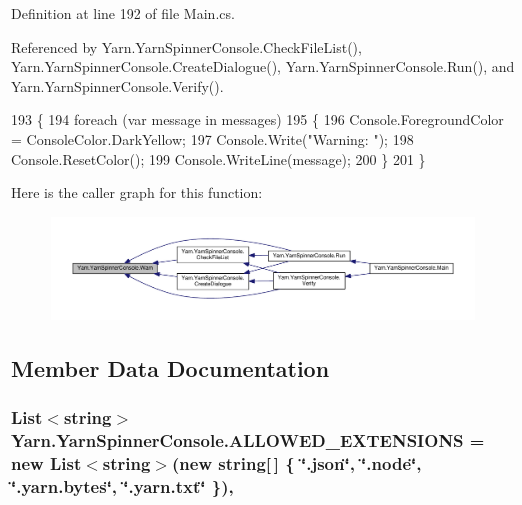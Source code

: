 Definition at line 192 of file Main.\-cs.



Referenced by Yarn.\-Yarn\-Spinner\-Console.\-Check\-File\-List(), Yarn.\-Yarn\-Spinner\-Console.\-Create\-Dialogue(), Yarn.\-Yarn\-Spinner\-Console.\-Run(), and Yarn.\-Yarn\-Spinner\-Console.\-Verify().


\begin{DoxyCode}
193         \{
194             \textcolor{keywordflow}{foreach} (var message \textcolor{keywordflow}{in} messages)
195             \{
196                 Console.ForegroundColor = ConsoleColor.DarkYellow;
197                 Console.Write(\textcolor{stringliteral}{"Warning: "});
198                 Console.ResetColor();
199                 Console.WriteLine(message);
200             \}
201         \}
\end{DoxyCode}


Here is the caller graph for this function\-:
\nopagebreak
\begin{figure}[H]
\begin{center}
\leavevmode
\includegraphics[width=350pt]{a00189_a979bb6f049b6c5294f745a19e24ddd9d_icgraph}
\end{center}
\end{figure}




\subsection{Member Data Documentation}
\hypertarget{a00189_a0979de7ea02c8c0375b8220a12e6575e}{
\subsubsection[{A\-L\-L\-O\-W\-E\-D\-\_\-\-E\-X\-T\-E\-N\-S\-I\-O\-N\-S}]{\setlength{\rightskip}{0pt plus 5cm}List$<$string$>$ Yarn.\-Yarn\-Spinner\-Console.\-A\-L\-L\-O\-W\-E\-D\-\_\-\-E\-X\-T\-E\-N\-S\-I\-O\-N\-S = new List$<$string$>$(new string\mbox{[}$\,$\mbox{]} \{ \char`\"{}.json\char`\"{}, \char`\"{}.node\char`\"{}, \char`\"{}.yarn.\-bytes\char`\"{}, \char`\"{}.yarn.\-txt\char`\"{} \})\hspace{0.3cm}{\ttfamily [static]}, {\ttfamily [package]}}}\label{a00189_a0979de7ea02c8c0375b8220a12e6575e}


